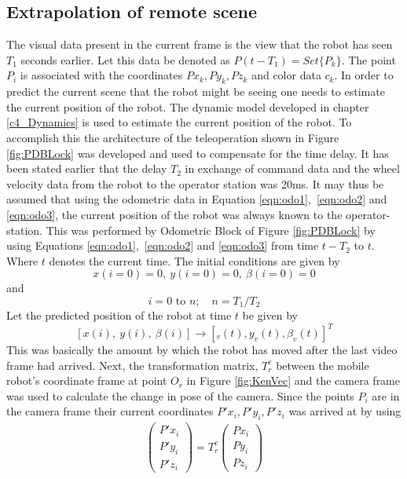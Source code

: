 \subsection{Extrapolation of remote scene } 
The visual data present in the current frame is the view that the robot has seen $T_1$ seconds earlier. Let this data be denoted as $P(t-T_1)=Set\{P_k\}$. The point $P_i$ is associated with the coordinates ${Px_k,Py_k,Pz_k}$ and color data $c_k$. In order to predict the current scene that the robot might be seeing one needs to estimate the current position of the robot. The dynamic model developed in chapter \ref{c4_Dynamics} is used to estimate the current position of the robot. To accomplish this the  architecture of the teleoperation shown in Figure \ref{fig:PDBLock} was developed and used to compensate for the time delay.
 It has been stated earlier that the delay $T_2$ in exchange of command data and the wheel velocity data from the robot to the operator station was 20ms. It may thus be assumed that  using the odometric data in Equation \ref{eqn:odo1},~\ref{eqn:odo2} and \ref{eqn:odo3}, the current position of the robot was always known to the operator-station. This was performed by Odometric Block of Figure \ref{fig:PDBLock} by using Equations \ref{eqn:odo1},~\ref{eqn:odo2} and \ref{eqn:odo3} from time $t-T_2$ to $t$. Where $t$ denotes the current time.   The initial conditions are given by \[x(i=0)=0,~y(i=0)=0 ,~ \beta(i=0)=0\] and  \[ i=0 \text{ to } n;  \quad n=T_1/T_2\] 
 Let the predicted position of the robot at time $t$ be given by 
\[[x(i),~y(i) ,~ \beta(i)]\rightarrow [_v(t),y_v(t),\beta_v(t)]^T\]
This was basically the amount by which the robot has moved after the last video frame had arrived. Next, the transformation matrix, $T^c_r$ between the mobile robot's coordinate frame at point $O_r$ in Figure \ref{fig:KenVec} and the camera frame was used to calculate the change in pose of the camera. Since the points $P_i$ are in the camera frame their current coordinates ${P'x_i,P'y_i,P'z_i}$ was arrived at by using 
\begin{eqnarray}
\begin{pmatrix}
P'x_i \\ P'y_i \\P'z_i
\end{pmatrix}=T^c_r
\begin{pmatrix}
Px_i\\Py_i\\Pz_i
\end{pmatrix}
\end{eqnarray}
